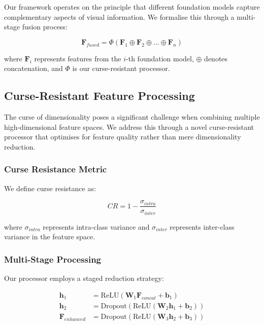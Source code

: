 \documentclass[11pt,a4paper]{article}
\begin{document}
Our framework operates on the principle that different foundation models capture complementary aspects of visual information. We formalise this through a multi-stage fusion process:

\begin{equation}
\mathbf{F}_{fused} = \Phi(\mathbf{F}_1 \oplus \mathbf{F}_2 \oplus \ldots \oplus \mathbf{F}_n)
\end{equation}

where $\mathbf{F}_i$ represents features from the $i$-th foundation model, $\oplus$ denotes concatenation, and $\Phi$ is our curse-resistant processor.

\subsection{Curse-Resistant Feature Processing}

The curse of dimensionality poses a significant challenge when combining multiple high-dimensional feature spaces. We address this through a novel curse-resistant processor that optimises for feature quality rather than mere dimensionality reduction.

\subsubsection{Curse Resistance Metric}

We define curse resistance as:

\begin{equation}
CR = 1 - \frac{\sigma_{intra}}{\sigma_{inter}}
\end{equation}

where $\sigma_{intra}$ represents intra-class variance and $\sigma_{inter}$ represents inter-class variance in the feature space.

\subsubsection{Multi-Stage Processing}

Our processor employs a staged reduction strategy:

\begin{align}
\mathbf{h}_1 &= \text{ReLU}(\mathbf{W}_1 \mathbf{F}_{concat} + \mathbf{b}_1) \\
\mathbf{h}_2 &= \text{Dropout}(\text{ReLU}(\mathbf{W}_2 \mathbf{h}_1 + \mathbf{b}_2)) \\
\mathbf{F}_{enhanced} &= \text{Dropout}(\text{ReLU}(\mathbf{W}_3 \mathbf{h}_2 + \mathbf{b}_3))
\end{align}
\end{document}

